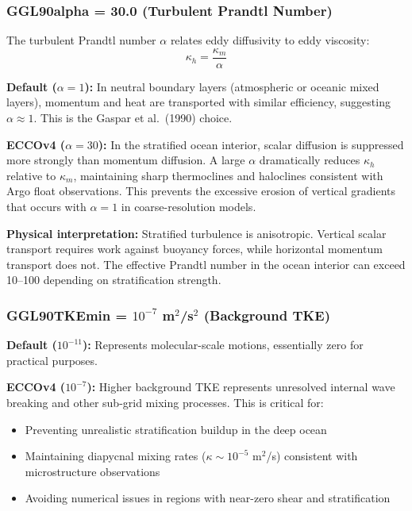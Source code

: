 \documentclass[12pt,letterpaper]{article}
\begin{document}
\subsubsection{GGL90alpha = 30.0 (Turbulent Prandtl Number)}

The turbulent Prandtl number $\alpha$ relates eddy diffusivity to eddy viscosity:
\[
\kappa_h = \frac{\kappa_m}{\alpha}
\]

\textbf{Default ($\alpha = 1$):} In neutral boundary layers (atmospheric or oceanic mixed layers), momentum and heat are transported with similar efficiency, suggesting $\alpha \approx 1$. This is the Gaspar et al.\ (1990) choice.

\textbf{ECCOv4 ($\alpha = 30$):} In the stratified ocean interior, scalar diffusion is suppressed more strongly than momentum diffusion. A large $\alpha$ dramatically reduces $\kappa_h$ relative to $\kappa_m$, maintaining sharp thermoclines and haloclines consistent with Argo float observations. This prevents the excessive erosion of vertical gradients that occurs with $\alpha = 1$ in coarse-resolution models.

\textbf{Physical interpretation:} Stratified turbulence is anisotropic. Vertical scalar transport requires work against buoyancy forces, while horizontal momentum transport does not. The effective Prandtl number in the ocean interior can exceed 10--100 depending on stratification strength.

\subsubsection{GGL90TKEmin = $10^{-7}$ m$^2$/s$^2$ (Background TKE)}

\textbf{Default ($10^{-11}$):} Represents molecular-scale motions, essentially zero for practical purposes.

\textbf{ECCOv4 ($10^{-7}$):} Higher background TKE represents unresolved internal wave breaking and other sub-grid mixing processes. This is critical for:
\begin{itemize}[leftmargin=*]
  \item Preventing unrealistic stratification buildup in the deep ocean
  \item Maintaining diapycnal mixing rates ($\kappa \sim 10^{-5}$ m$^2$/s) consistent with microstructure observations
  \item Avoiding numerical issues in regions with near-zero shear and stratification
\end{itemize}
\end{document}
